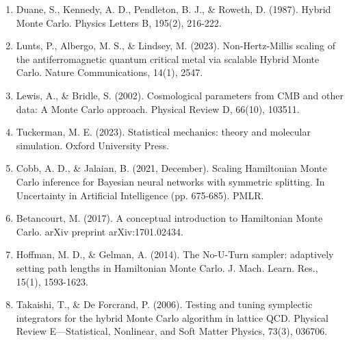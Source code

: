 \documentclass[12pt,lettersize,oneside]{book} %
\begin{document}
\begin{talk}
\begin{enumerate}
\item[{[1]}] Duane, S., Kennedy, A. D., Pendleton, B. J., \& Roweth, D. (1987). Hybrid Monte Carlo. Physics Letters B, 195(2), 216-222.
\item[{[2]}] Lunts, P., Albergo, M. S., \& Lindsey, M. (2023). Non-Hertz-Millis scaling of the antiferromagnetic quantum critical metal via scalable Hybrid Monte Carlo. Nature Communications, 14(1), 2547.
\item[{[3]}] Lewis, A., \& Bridle, S. (2002). Cosmological parameters from CMB and other data: A Monte Carlo approach. Physical Review D, 66(10), 103511.
\item[{[4]}] Tuckerman, M. E. (2023). Statistical mechanics: theory and molecular simulation. Oxford University Press.
\item[{[5]}] Cobb, A. D., \& Jalaian, B. (2021, December). Scaling Hamiltonian Monte Carlo inference for Bayesian neural networks with symmetric splitting. In Uncertainty in Artificial Intelligence (pp. 675-685). PMLR.
\item[{[6]}] Betancourt, M. (2017). A conceptual introduction to Hamiltonian Monte Carlo. arXiv preprint arXiv:1701.02434.
\item[{[7]}] Hoffman, M. D., \& Gelman, A. (2014). The No-U-Turn sampler: adaptively setting path lengths in Hamiltonian Monte Carlo. J. Mach. Learn. Res., 15(1), 1593-1623.
\item[{[8]}] Takaishi, T., \& De Forcrand, P. (2006). Testing and tuning symplectic integrators for the hybrid Monte Carlo algorithm in lattice QCD. Physical Review E—Statistical, Nonlinear, and Soft Matter Physics, 73(3), 036706.
\end{enumerate}


\end{talk}
\end{document}
